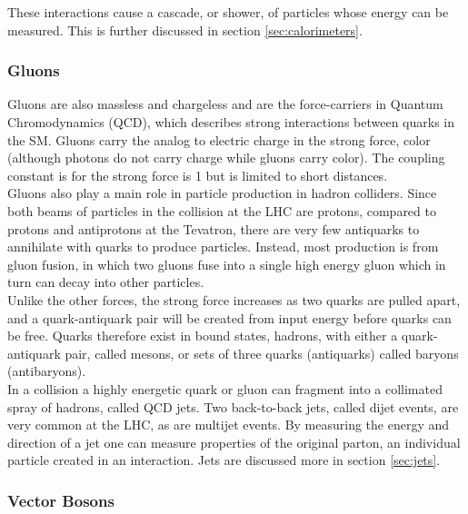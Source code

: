 	These interactions cause a cascade, or shower, of particles whose energy can be measured.  This is further discussed in section \ref{sec:calorimeters}. \\
	
	\subsubsection{Gluons}
	
	Gluons are also massless and chargeless and are the force-carriers in Quantum Chromodynamics (QCD), which describes strong interactions between quarks in the SM.  Gluons carry the analog to electric charge in the strong force, color (although photons do not carry charge while gluons carry color).  The coupling constant is for the strong force is 1 but is limited to short distances.  \\
	
	Gluons also play a main role in particle production in hadron colliders.  Since both beams of particles in the collision at the LHC are protons, compared to protons and antiprotons at the Tevatron, there are very few antiquarks to annihilate with quarks to produce particles.  Instead, most production is from gluon fusion, in which two gluons fuse into a single high energy gluon which in turn can decay into other particles. \\%
	
	Unlike the other forces, the strong force increases as two quarks are pulled apart, and a quark-antiquark pair will be created from input energy before quarks can be free.  Quarks therefore exist in bound states, hadrons, with either a quark-antiquark pair, called mesons, or sets of three quarks (antiquarks) called baryons (antibaryons).  \\
	
	In a collision a highly energetic quark or gluon can fragment into a collimated spray of hadrons, called QCD jets.  Two back-to-back jets, called dijet events, are very common at the LHC, as are multijet events.  By measuring the energy and direction of a jet one can measure properties of the original parton, an individual particle created in an interaction.  Jets are discussed more in section \ref{sec:jets}.  \\
	
	
	\subsubsection{Vector Bosons}
	
